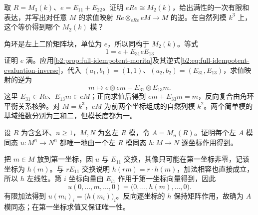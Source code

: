 \begin{exercise}\label{b2:ex:16-rectangular-morita}
	取 \(R=M_3(k)\)、\(e=E_{11}+E_{22}\)。证明 \(eRe\cong M_2(k)\)，给出满性的一次有限和表达，并写出对任意 \(M\) 的求值映射 \(Re\otimes_{eRe}eM\rightarrow M\) 的逆。在自然列模 \(k^3\) 上，这个等价得到哪个 \(M_2(k)\) 模？
\end{exercise}
\begin{solution}
	角环是左上二阶矩阵块，单位为 \(e\)，所以同构于 \(M_2(k)\)。等式
	\[
		1=e+E_{31}eE_{13}
	\]
	证明 \(e\) 满。应用\cref{b2:prop:full-idempotent-morita}及其逆式\eqref{b2:eq:full-idempotent-evaluation-inverse}，代入 \((a_1,b_1)=(1,1)\)、\((a_2,b_2)=(E_{31},E_{13})\)，求值映射的逆为
	\[
		m\longmapsto e\otimes em+E_{31}\otimes E_{13}m.
	\]
	这里 \(E_{31}\in Re\)、\(E_{13}m\in eM\)；正向求值后得到 \(em+E_{33}m=m\)，反向复合由角环平衡关系核验。对 \(M=k^3\)，\(eM\) 为前两个坐标组成的自然列模 \(k^2\)。两个简单模的基域维数分别为三和二，但模长度都为一。
\end{solution}

\begin{exercise}\label{b2:ex:16-matrix-hom}
	设 \(R\) 为含幺环、\(n\ge1\)，\(M,N\) 为幺左 \(R\) 模，令 \(A=M_n(R)\)。证明每个左 \(A\) 模同态 \(u:M^n\rightarrow N^n\) 都唯一地由一个左 \(R\) 模同态 \(h:M\rightarrow N\) 逐坐标作用得到。
\end{exercise}
\begin{solution}
	把 \(m\in M\) 放到第一坐标，因 \(u\) 与 \(E_{11}\) 交换，其像只可能在第一坐标非零，记该坐标为 \(h(m)\)。与 \(rE_{11}\) 交换说明 \(h(rm)=r\cdot h(m)\)，加法相容也直接成立，所以 \(h\) 左线性。第 \(i\) 坐标向量由 \(E_{i1}\) 作用于第一坐标向量得到，因此
	\[
		u(0,\ldots,m,\ldots,0)=\bigl(0,\ldots,h(m),\ldots,0\bigr).
	\]
	有限加法得到 \(u(m_i)_i=\bigl(h(m_i)\bigr)_i\)。反向逐坐标的 \(h\) 保持矩阵作用，故确为 \(A\) 模同态；在第一坐标求值又保证唯一性。
\end{solution}

